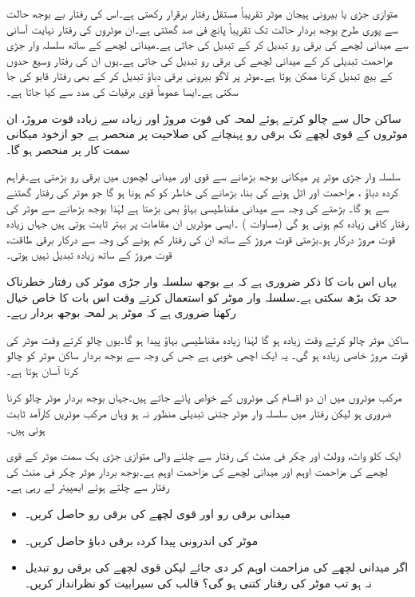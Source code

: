 متوازی جڑی یا بیرونی ہیجان موٹر تقریباً  مستقل رفتار  برقرار رکھتی ہے۔اس کی رفتار بے بوجھ حالت سے پوری طرح بوجھ بردار حالت تک تقریباً  پانچ فی صد گھٹتی ہے۔ان موٹروں کی رفتار نہایت آسانی سے میدانی لچھے کی  برقی رو تبدیل کر کے تبدیل کی جاتی ہے۔میدانی لچھے کے ساتھ سلسلہ وار جڑی مزاحمت تبدیلی کر کے میدانی لچھے کی برقی رو تبدیل کی جاتی ہے۔یوں ان کی رفتار  وسیع حدوں کے بیچ تبدیل کرنا ممکن ہوتا ہے۔موٹر پر لاگو بیرونی برقی دباؤ تبدیل کر کے بھی رفتار قابو کی جا سکتی ہے۔ایسا عموماً قوی برقیات کی مدد سے کیا جاتا ہے۔

ساکن حال سے چالو کرتے ہوئے لمحہ کی قوت مروڑ اور  زیادہ سے زیادہ قوت مروڑ، ان موٹروں کے  قوی لچھے تک برقی رو پہنچانے کی صلاحیت پر منحصر  ہے جو ازخود میکانی سمت کار پر منحصر ہو گا۔

سلسلہ وار جڑی موٹر پر میکانی بوجھ بڑھانے سے  قوی اور میدانی لچھوں میں برقی رو  بڑھتی ہے۔فراہم کردہ دباؤ  ، مزاحمت   اور  اٹل ہونے کی بنا،  بڑھانے کی خاطر   کو کم ہونا ہو گا  جو موٹر کی رفتار گھٹنے سے ہو گا۔ بڑھتے  کی وجہ سے  میدانی مقناطیسی بہاؤ  بھی بڑھتا ہے لہٰذا  بوجھ بڑھانے سے  موٹر کی رفتار کافی زیادہ کم ہونی ہو گی (مساوات ) ۔ایسی موٹریں ان مقامات پر بہتر ثابت ہوتی ہیں جہاں زیادہ قوت مروڑ درکار ہو۔بڑھتی قوت مروڑ کے ساتھ ان کی رفتار کم ہونے کی وجہ سے  درکار برقی طاقت، قوت مروڑ کے ساتھ زیادہ تبدیل نہیں ہوتی۔

یہاں اس بات کا ذکر ضروری ہے کہ بے بوجھ سلسلہ وار جڑی موٹر کی رفتار خطرناک حد تک بڑھ سکتی ہے۔سلسلہ وار موٹر کو استعمال کرتے وقت اس بات کا خاص خیال رکھنا ضروری ہے کہ موٹر ہر لمحہ بوجھ بردار رہے۔

ساکن  موٹر چالو کرتے وقت     زیادہ ہو گا لہٰذا زیادہ  مقناطیسی بہاؤ پیدا ہو گا۔یوں چالو کرتے وقت موٹر کی قوت مروڑ خاصی زیادہ ہو گی۔ یہ ایک اچھی خوبی ہے جس کی وجہ سے  بوجھ بردار ساکن موٹر کو چالو کرنا آسان ہوتا ہے۔

مرکب موٹروں میں ان دو اقسام کی موٹروں کے خواص پائے جاتے ہیں۔جہاں بوجھ بردار موٹر چالو کرنا ضروری ہو لیکن رفتار میں سلسلہ وار موٹر جتنی تبدیلی منظور نہ ہو وہاں مرکب موٹریں کارآمد ثابت ہوتی ہیں۔

ایک   کلو واٹ،  وولٹ اور  چکر فی منٹ کی رفتار سے چلنے والی متوازی جڑی یک سمت  موٹر کے قوی لچھے کی مزاحمت  اوہم اور میدانی لچھے کی مزاحمت   اوہم ہے۔بوجھ بردار موٹر    چکر فی منٹ کی رفتار سے چلتے ہوئے   ایمپیئر لے رہی ہے۔ 
\begin{itemize}
\item
میدانی برقی رو اور قوی لچھے کی  برقی رو حاصل کریں۔
\item
موٹر کی اندرونی پیدا کردہ برقی دباؤ حاصل کریں۔
\item
اگر میدانی لچھے کی مزاحمت  اوہم کر دی جائے  لیکن قوی لچھے کی  برقی رو تبدیل نہ ہو  تب موٹر کی رفتار کتنی ہو گی؟ قالب کی سیرابیت کو نظرانداز کریں۔
\end{itemize}

